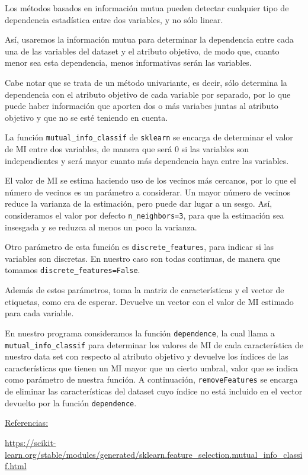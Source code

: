 \documentclass[a4]{article}
\begin{document}
Los métodos basados en información mutua pueden detectar cualquier tipo de dependencia estadística entre dos variables, y no sólo linear. 

Así, usaremos la información mutua para determinar la dependencia entre cada una de las variables del dataset y el atributo objetivo, de modo que, cuanto menor sea esta dependencia, menos informativas serán las variables. 

Cabe notar que se trata de un método univariante, es decir, sólo determina la dependencia con el atributo objetivo de cada variable por separado, por lo que puede haber información que aporten dos o más variabes juntas al atributo objetivo y que no se esté teniendo en cuenta.

La función \lstinline|mutual_info_classif| de \lstinline|sklearn| se encarga de determinar el valor de MI entre dos variables, de manera que será 0 si las variables son independientes y será mayor cuanto más dependencia haya entre las variables. 

El valor de MI se estima haciendo uso de los vecinos más cercanos, por lo que el número de vecinos es un parámetro a considerar. Un mayor número de vecinos reduce la varianza de la estimación, pero puede dar lugar a un sesgo. Así, consideramos el valor por defecto \lstinline|n_neighbors=3|, para que la estimación sea insesgada y se reduzca al menos un poco la varianza. 

Otro parámetro de esta función es \lstinline|discrete_features|, para indicar si las variables son discretas. En nuestro caso son todas continuas, de manera que tomamos \lstinline|discrete_features=False|.

Además de estos parámetros, toma la matriz de características y el vector de etiquetas, como era de esperar. Devuelve un vector con el valor de MI estimado para cada variable. 

En nuestro programa consideramos la función \lstinline|dependence|, la cual llama a \lstinline|mutual_info_classif| para determinar los valores de MI de cada característica de nuestro data set con respecto al atributo objetivo y devuelve los índices de las características que tienen un MI mayor que un cierto umbral, valor que se indica como parámetro de nuestra función. A continuación, \lstinline|removeFeatures| se encarga de eliminar las características del dataset cuyo índice no está incluido en el vector devuelto por la función \lstinline|dependence|.


\underline{Referencias:}

\href{https://scikit-learn.org/stable/modules/generated/sklearn.feature_selection.mutual_info_classif.html}{https://scikit-learn.org/stable/modules/generated/sklearn.feature\_selection.mutual\_info\_classif.html}
\end{document}
